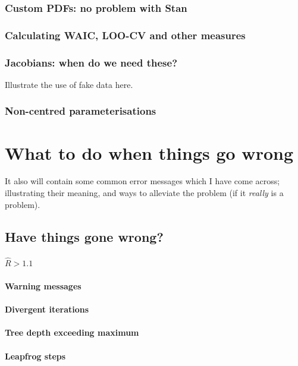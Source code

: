\documentclass[11pt,fullpage]{book}
\begin{document}
\subsubsection{Custom PDFs: no problem with Stan}\label{sec:StanJags_customPDF}

\subsubsection{Calculating WAIC, LOO-CV and other measures}\label{sec:StanJags_WAICLOO}

\subsubsection{Jacobians: when do we need these?}
Illustrate the use of fake data here.

\subsubsection{Non-centred parameterisations}

\section{What to do when things go wrong}
It also will contain some common error messages which I have come across; illustrating their meaning, and ways to alleviate the problem (if it \textit{really} is a problem).

\subsection{Have things gone wrong?}
\paragraph{$\hat{R} > 1.1$}
\paragraph{Warning messages}
\paragraph{Divergent iterations}
\paragraph{Tree depth exceeding maximum}
\paragraph{Leapfrog steps}
\end{document}
